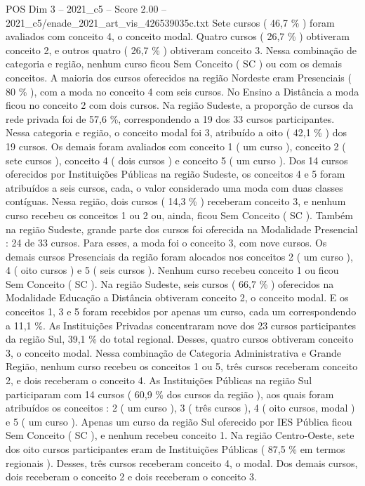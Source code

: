 \begin{textsample}{POS Dim 3 – 2021\_c5 – Score 2.00 – 2021\_c5/enade\_2021\_art\_vis\_426539035c.txt}
Sete cursos ( 46,7 \% ) foram avaliados com conceito 4, o conceito modal.
Quatro cursos ( 26,7 \% ) obtiveram conceito 2, e outros quatro ( 26,7 \% ) obtiveram conceito 3.
Nessa combinação de categoria e região, nenhum curso ficou Sem Conceito ( SC ) ou com os demais conceitos.
A maioria dos cursos oferecidos na região Nordeste eram Presenciais ( 80 \% ), com a moda no conceito 4 com seis cursos.
No Ensino a Distância a moda ficou no conceito 2 com dois cursos.
Na região Sudeste, a proporção de cursos da rede privada foi de 57,6 \%, correspondendo a 19 dos 33 cursos participantes.
Nessa categoria e região, o conceito modal foi 3, atribuído a oito ( 42,1 \% ) dos 19 cursos.
Os demais foram avaliados com conceito 1 ( um curso ), conceito 2 ( sete cursos ), conceito 4 ( dois cursos ) e conceito 5 ( um curso ).
Dos 14 cursos oferecidos por Instituições Públicas na região Sudeste, os conceitos 4 e 5 foram atribuídos a seis cursos, cada, o valor considerado uma moda com duas classes contíguas.
Nessa região, dois cursos ( 14,3 \% ) receberam conceito 3, e nenhum curso recebeu os conceitos 1 ou 2 ou, ainda, ficou Sem Conceito ( SC ).
Também na região Sudeste, grande parte dos cursos foi oferecida na Modalidade Presencial : 24 de 33 cursos.
Para esses, a moda foi o conceito 3, com nove cursos.
Os demais cursos Presenciais da região foram alocados nos conceitos 2 ( um curso ), 4 ( oito cursos ) e 5 ( seis cursos ).
Nenhum curso recebeu conceito 1 ou ficou Sem Conceito ( SC ).
Na região Sudeste, seis cursos ( 66,7 \% ) oferecidos na Modalidade Educação a Distância obtiveram conceito 2, o conceito modal.
E os conceitos 1, 3 e 5 foram recebidos por apenas um curso, cada um correspondendo a 11,1 \%.
As Instituições Privadas concentraram nove dos 23 cursos participantes da região Sul, 39,1 \% do total regional.
Desses, quatro cursos obtiveram conceito 3, o conceito modal.
Nessa combinação de Categoria Administrativa e Grande Região, nenhum curso recebeu os conceitos 1 ou 5, três cursos receberam conceito 2, e dois receberam o conceito 4.
As Instituições Públicas na região Sul participaram com 14 cursos ( 60,9 \% dos cursos da região ), aos quais foram atribuídos os conceitos : 2 ( um curso ), 3 ( três cursos ), 4 ( oito cursos, modal ) e 5 ( um curso ).
Apenas um curso da região Sul oferecido por IES Pública ficou Sem Conceito ( SC ), e nenhum recebeu conceito 1.
Na região Centro-Oeste, sete dos oito cursos participantes eram de Instituições Públicas ( 87,5 \% em termos regionais ).
Desses, três cursos receberam conceito 4, o modal.
Dos demais cursos, dois receberam o conceito 2 e dois receberam o conceito 3.

\end{textsample}
